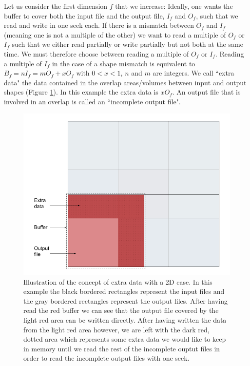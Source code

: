 \documentclass[conference]{IEEEtran}
\begin{document}
Let us consider the first dimension $f$ that we increase: Ideally, one wants the buffer to cover both the input file and the output file, $I_f$ and $O_f$, such that we read and write in one seek each.
If there is a mismatch between $O_f$ and $I_f$ (meaning one is not a multiple of the other) we want to read a multiple of $O_f$ or $I_f$ such that we either read partially or write partially but not both at the same time.
We must therefore choose between reading a multiple of $O_f$ or $I_f$.
Reading a multiple of $I_f$ in the case of a shape mismatch is equivalent to $B_f = nI_f = mO_f+xO_f$ with $0<x<1$, $n$ and $m$ are integers.
We call ``extra data" the data contained in the overlap areas/volumes between input and output shapes (Figure \ref{fig:overlap}).
In this example the extra data is $xO_f$.
An output file that is involved in an overlap is called an ``incomplete output file". \\

\begin{figure}[h]
\centering
\includegraphics[scale=0.2]{./figures/overlap.png}
\caption{Illustration of the concept of extra data with a 2D case. In this example the black bordered rectangles represent the input files and the gray bordered rectangles represent the output files. After having read the red buffer we can see that the output file covered by the light red area can be written directly. After having written the data from the light red area however, we are left with the dark red, dotted area which represents some extra data we would like to keep in memory until we read the rest of the incomplete ouptut files in order to read the incomplete output files with one seek.
}
\label{fig:overlap}
\end{figure}
\end{document}
